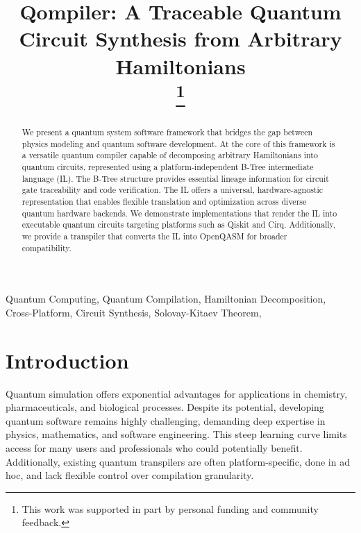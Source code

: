 \documentclass[conference]{IEEEtran}
\begin{document}
    \title{Qompiler: A Traceable Quantum Circuit Synthesis from Arbitrary Hamiltonians \\
    \thanks{This work was supported in part by personal funding and community feedback.}
    }

    \author{
    }

    \maketitle

    \begin{abstract}
        We present a quantum system software framework that bridges the gap between physics modeling and quantum software development.
        At the core of this framework is a versatile quantum compiler capable of decomposing arbitrary Hamiltonians into quantum circuits, represented using a platform-independent B-Tree intermediate language (IL).
        The B-Tree structure provides essential lineage information for circuit gate traceability and code verification.
        The IL offers a universal, hardware-agnostic representation that enables flexible translation and optimization across diverse quantum hardware backends.
        We demonstrate implementations that render the IL into executable quantum circuits targeting platforms such as Qiskit and Cirq.
        Additionally, we provide a transpiler that converts the IL into OpenQASM for broader compatibility.
    \end{abstract}

    \begin{IEEEkeywords}
        Quantum Computing, Quantum Compilation, Hamiltonian Decomposition, Cross-Platform, Circuit Synthesis, Solovay-Kitaev Theorem,
    \end{IEEEkeywords}


    \section{Introduction}\label{sec:introduction}

    Quantum simulation offers exponential advantages for applications in chemistry, pharmaceuticals, and biological processes.
    Despite its potential, developing quantum software remains highly challenging, demanding deep expertise in physics, mathematics, and software engineering.
    This steep learning curve limits access for many users and professionals who could potentially benefit.
    Additionally, existing quantum transpilers are often platform-specific, done in ad hoc, and lack flexible control over compilation granularity.
\end{document}
